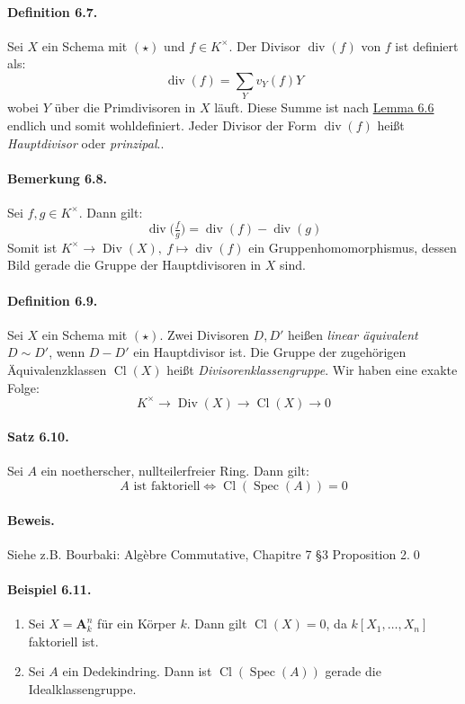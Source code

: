 \paragraph{Definition 6.7.}\label{6.7} Sei $X$ ein Schema mit $(\star)$ und $f\in K^\times$. Der Divisor $\operatorname{div}(f)$ von $f$ ist definiert als:
\[\operatorname{div}(f)=\sum_Y v_Y(f)Y \]
wobei $Y$ über die Primdivisoren in $X$ läuft. Diese Summe ist nach \hyperref[6.6]{Lemma 6.6} endlich und somit wohldefiniert. Jeder Divisor der Form $\operatorname{div}(f)$ heißt \textit{Hauptdivisor} oder \textit{prinzipal}..

\paragraph{Bemerkung 6.8.}\label{6.8} Sei $f,g\in K^\times$. Dann gilt:
\[\operatorname{div}\big(\tfrac{f}{g}\big)=\operatorname{div}(f)-\operatorname{div}(g) \]
Somit ist $K^\times\to\operatorname{Div}(X),\ f\mapsto\operatorname{div}(f)$ ein Gruppenhomomorphismus, dessen Bild gerade die Gruppe der Hauptdivisoren in $X$ sind.

\paragraph{Definition 6.9.}\label{6.9} Sei $X$ ein Schema mit $(\star)$. Zwei Divisoren $D,D'$ heißen \textit{linear äquivalent} $D\sim D'$, wenn $D-D'$ ein Hauptdivisor ist. Die Gruppe der zugehörigen Äquivalenzklassen $\operatorname{Cl}(X)$ heißt \textit{Divisorenklassengruppe}. Wir haben eine exakte Folge:
\[K^\times\to\operatorname{Div}(X)\to\operatorname{Cl}(X)\to 0 \]

\paragraph{Satz 6.10.}\label{6.10} Sei $A$ ein noetherscher, nullteilerfreier Ring. Dann gilt:
\[A\text{ ist faktoriell}\iff\operatorname{Cl}(\operatorname{Spec}(A))=0 \]

\paragraph{Beweis.} Siehe z.B. Bourbaki: Algèbre Commutative, Chapitre 7 §3 Proposition 2.\qed

\paragraph{Beispiel 6.11.}\label{6.11} \begin{enumerate}
\item Sei $X=\mathbf{A}_k^n$ für ein Körper $k$. Dann gilt $\operatorname{Cl}(X)=0$, da $k[X_1,\ldots,X_n]$ faktoriell ist.
\item Sei $A$ ein Dedekindring. Dann ist $\operatorname{Cl}(\operatorname{Spec}(A))$ gerade die Idealklassengruppe.
\end{enumerate}


